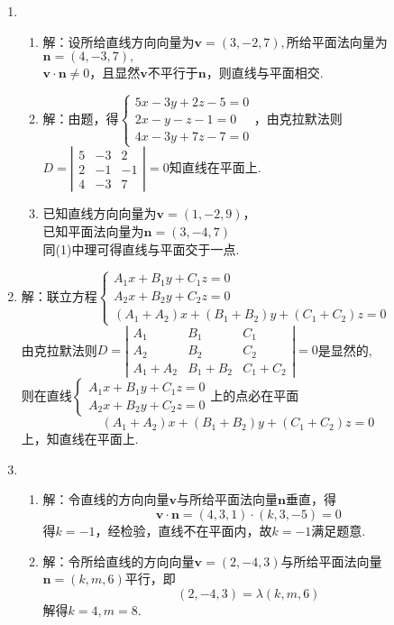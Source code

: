 \documentclass[UTF8]{ctexart}
\begin{document}
\begin{enumerate}
\item \begin{enumerate}[(1)]
\item 解：设所给直线方向向量为$\mathbf{v}=\left(3,-2,7\right),$所给平面法向量为$\mathbf{n}=\left(4,-3,7\right),$\\
$\mathbf{v}\cdot\mathbf{n}\neq0$，且显然$\mathbf{v}$不平行于$\mathbf{n}$，则直线与平面相交. 
\item 解：由题，得$\left\{\begin{array}{l}5x-3y+2z-5=0\\2x-y-z-1=0\\4x-3y+7z-7=0\end{array}\right.$，由克拉默法则$D=\left|\begin{array}{ccc}5&-3&2\\2&-1&-1\\4&-3&7\end{array}\right|=0$知直线在平面上. 
\item 已知直线方向向量为$\mathbf{v}=\left(1,-2,9\right)$，\\
已知平面法向量为$\mathbf{n}=\left(3,-4,7\right)$\\
同(1)中理可得直线与平面交于一点. 
\end{enumerate}

\item 解：联立方程$\left\{\begin{array}{l}A_1x+B_1y+C_1z=0\\A_2x+B_2y+C_2z=0\\\left(A_1+A_2\right)x+\left(B_1+B_2\right)y+\left(C_1+C_2\right)z=0\end{array}\right.$\\
由克拉默法则$D=\left|\begin{array}{ccc}A_1&B_1&C_1\\A_2&B_2&C_2\\A_1+A_2&B_1+B_2&C_1+C_2\end{array}\right|=0$是显然的,\\
则在直线$\left\{\begin{array}{l}A_1x+B_1y+C_1z=0\\A_2x+B_2y+C_2z=0\end{array}\right.$上的点必在平面$$\left(A_1+A_2\right)x+\left(B_1+B_2\right)y+\left(C_1+C_2\right)z=0$$上，知直线在平面上. 

\item \begin{enumerate}[(1)]
\item 解：令直线的方向向量$\mathbf{v}$与所给平面法向量$\mathbf{n}$垂直，得$$\mathbf{v}\cdot\mathbf{n}=\left(4,3,1\right)\cdot\left(k,3,-5\right)=0$$得$k=-1$，经检验，直线不在平面内，故$k=-1$满足题意.
\item 解：令所给直线的方向向量$\mathbf{v}=\left(2,-4,3\right)$与所给平面法向量$\mathbf{n}=\left(k,m,6\right)$平行，即$$\left(2,-4,3\right)=\lambda\left(k,m,6\right)$$解得$k=4,m=8.$
\end{enumerate}


\end{enumerate}
\end{document}
